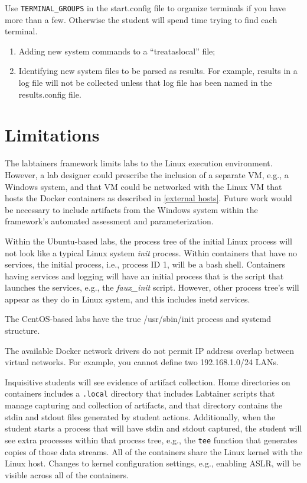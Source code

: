 \documentclass[12pt]{article}
\begin{document}
Use {\tt TERMINAL\_GROUPS} in the start.config file to organize terminals if you have more
than a few.  Otherwise the student will spend time trying to find each terminal.

\begin{enumerate}
\item Adding new system commands to a ``treataslocal'' file;
\item Identifying new system files to be parsed as results.  For example, results in a log
file will not be collected unless that log file has been named in the results.config file.
\end{enumerate}

\section{Limitations}
The labtainers framework limits labs to the Linux execution environment.
However, a lab designer could prescribe the inclusion of a separate
VM, e.g., a Windows system, and that VM could be networked with the Linux
VM that hosts the Docker containers as described in \ref{external hosts}.  
Future work would be necessary to include
artifacts from the Windows system within the framework's automated assessment
and parameterization.

Within the Ubuntu-based labs, the process tree of the initial Linux process will
not look like a typical Linux system \textit{init} process.  Within containers that have no
services, the initial process, i.e., process ID 1, will be a bash shell.
Containers having services and logging will have an initial process that is
the script that launches the services, e.g., the \textit{faux\_init} script.  However,
other process tree's will appear as they
do in Linux system, and this includes inetd services.

The CentOS-based labs have the true /usr/sbin/init process and systemd structure.

The available Docker network drivers do not permit IP address overlap between virtual networks.
For example, you cannot define two 192.168.1.0/24 LANs.

Inquisitive students will see evidence of artifact collection.  Home directories
on containers includes a \texttt{.local} directory that includes Labtainer scripts that manage
capturing and collection of artifacts, and that directory contains the stdin and
stdout files generated by student actions. Additionally, when the student starts a process
that will have stdin and stdout captured, the student will see extra processes within
that process tree, e.g., the \texttt{tee} function that generates copies of those data streams.
All of the containers share the Linux kernel with the Linux host.  Changes to
kernel configuration settings, e.g., enabling ASLR, will be visible across all
of the containers.
\end{document}
